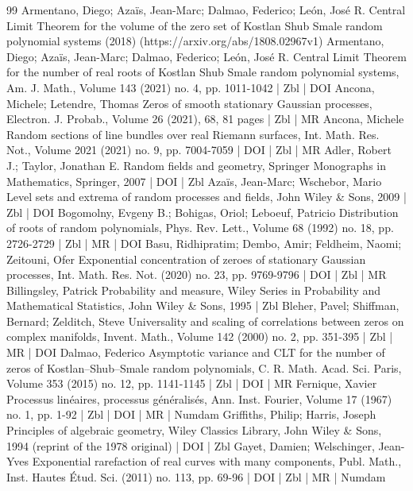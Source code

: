 \documentclass[10pt]{amsart}
\theoremstyle{definition}\newtheorem{defi}[theo]{Definition}\newtheorem{rema}[theo]{Remark}\newtheorem{exam}[theo]{Example}\newtheorem{exem}[theo]{Example}\newtheorem{nota}[theo]{Notation}
\begin{document}
\begin{thebibliography}{99}
Armentano, Diego; Azaïs, Jean-Marc; Dalmao, Federico; León, José R. Central Limit Theorem for the volume of the zero set of Kostlan Shub Smale random polynomial systems (2018) (https://arxiv.org/abs/1808.02967v1)
Armentano, Diego; Azaïs, Jean-Marc; Dalmao, Federico; León, José R. Central Limit Theorem for the number of real roots of Kostlan Shub Smale random polynomial systems, Am. J. Math., Volume 143 (2021) no. 4, pp. 1011-1042 | Zbl | DOI
Ancona, Michele; Letendre, Thomas Zeros of smooth stationary Gaussian processes, Electron. J. Probab., Volume 26 (2021), 68, 81 pages | Zbl | MR
Ancona, Michele Random sections of line bundles over real Riemann surfaces, Int. Math. Res. Not., Volume 2021 (2021) no. 9, pp. 7004-7059 | DOI | Zbl | MR
Adler, Robert J.; Taylor, Jonathan E. Random fields and geometry, Springer Monographs in Mathematics, Springer, 2007 | DOI | Zbl
Azaïs, Jean-Marc; Wschebor, Mario Level sets and extrema of random processes and fields, John Wiley \& Sons, 2009 | Zbl | DOI
Bogomolny, Evgeny B.; Bohigas, Oriol; Leboeuf, Patricio Distribution of roots of random polynomials, Phys. Rev. Lett., Volume 68 (1992) no. 18, pp. 2726-2729 | Zbl | MR | DOI
Basu, Ridhipratim; Dembo, Amir; Feldheim, Naomi; Zeitouni, Ofer Exponential concentration of zeroes of stationary Gaussian processes, Int. Math. Res. Not. (2020) no. 23, pp. 9769-9796 | DOI | Zbl | MR
Billingsley, Patrick Probability and measure, Wiley Series in Probability and Mathematical Statistics, John Wiley \& Sons, 1995 | Zbl
Bleher, Pavel; Shiffman, Bernard; Zelditch, Steve Universality and scaling of correlations between zeros on complex manifolds, Invent. Math., Volume 142 (2000) no. 2, pp. 351-395 | Zbl | MR | DOI
Dalmao, Federico Asymptotic variance and CLT for the number of zeros of Kostlan–Shub–Smale random polynomials, C. R. Math. Acad. Sci. Paris, Volume 353 (2015) no. 12, pp. 1141-1145 | Zbl | DOI | MR
Fernique, Xavier Processus linéaires, processus généralisés, Ann. Inst. Fourier, Volume 17 (1967) no. 1, pp. 1-92 | Zbl | DOI | MR | Numdam
Griffiths, Philip; Harris, Joseph Principles of algebraic geometry, Wiley Classics Library, John Wiley \& Sons, 1994 (reprint of the 1978 original) | DOI | Zbl
Gayet, Damien; Welschinger, Jean-Yves Exponential rarefaction of real curves with many components, Publ. Math., Inst. Hautes Étud. Sci. (2011) no. 113, pp. 69-96 | DOI | Zbl | MR | Numdam

\end{thebibliography}
\end{document}
